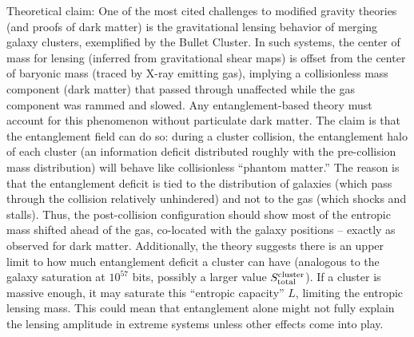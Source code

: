 \documentclass[11pt]{article}
\begin{document}
Theoretical claim: One of the most cited challenges to modified gravity theories (and proofs of dark matter) is the gravitational lensing behavior of merging galaxy clusters, exemplified by the Bullet Cluster. In such systems, the center of mass for lensing (inferred from gravitational shear maps) is offset from the center of baryonic mass (traced by X-ray emitting gas), implying a collisionless mass component (dark matter) that passed through unaffected while the gas component was rammed and slowed. Any entanglement-based theory must account for this phenomenon without particulate dark matter. The claim is that the entanglement field can do so: during a cluster collision, the entanglement halo of each cluster (an information deficit distributed roughly with the pre-collision mass distribution) will behave like collisionless “phantom matter.” The reason is that the entanglement deficit is tied to the distribution of galaxies (which pass through the collision relatively unhindered) and not to the gas (which shocks and stalls). Thus, the post-collision configuration should show most of the entropic mass shifted ahead of the gas, co-located with the galaxy positions – exactly as observed for dark matter. Additionally, the theory suggests there is an upper limit to how much entanglement deficit a cluster can have (analogous to the galaxy saturation at $10^{57}$ bits, possibly a larger value $S_{\rm total}^{\rm cluster}$). If a cluster is massive enough, it may saturate this “entropic capacity” $L$, limiting the entropic lensing mass. This could mean that entanglement alone might not fully explain the lensing amplitude in extreme systems unless other effects come into play.
\end{document}
